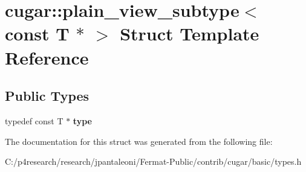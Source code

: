 \hypertarget{structcugar_1_1plain__view__subtype_3_01const_01_t_01_5_01_4}{}\section{cugar\+:\+:plain\+\_\+view\+\_\+subtype$<$ const T $\ast$ $>$ Struct Template Reference}
\label{structcugar_1_1plain__view__subtype_3_01const_01_t_01_5_01_4}
\subsection*{Public Types}
\begin{DoxyCompactItemize}
\item 
\mbox{\label{structcugar_1_1plain__view__subtype_3_01const_01_t_01_5_01_4_ac7d8fb51fff4adf47b66059ac89a8ba5}} 
typedef const T $\ast$ {\bfseries type}
\end{DoxyCompactItemize}


The documentation for this struct was generated from the following file\+:\begin{DoxyCompactItemize}
\item 
C\+:/p4research/research/jpantaleoni/\+Fermat-\/\+Public/contrib/cugar/basic/types.\+h\end{DoxyCompactItemize}
